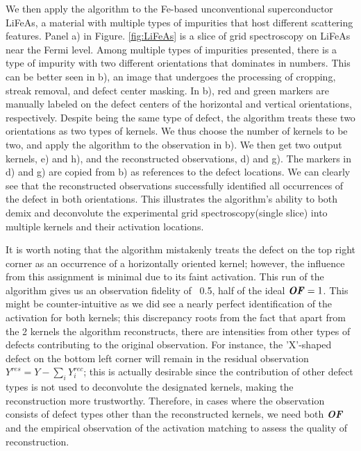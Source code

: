 We then apply the algorithm to the Fe-based unconventional superconductor LiFeAs, a material with multiple types of impurities that host different scattering features. Panel a) in Figure. \ref{fig:LiFeAs} is a slice of grid spectroscopy on LiFeAs near the Fermi level. Among multiple types of impurities presented, there is a type of impurity with two different orientations that dominates in numbers. This can be better seen in b), an image that undergoes the processing of cropping, streak removal, and defect center masking. In b), red and green markers are manually labeled on the defect centers of the horizontal and vertical orientations, respectively. Despite being the same type of defect, the algorithm treats these two orientations as two types of kernels. We thus choose the number of kernels to be two, and apply the algorithm to the observation in b). We then get two output kernels, e) and h), and the reconstructed observations, d) and g). The markers in d) and g) are copied from b) as references to the defect locations. We can clearly see that the reconstructed observations successfully identified all occurrences of the defect in both orientations. This illustrates the algorithm's ability to both demix and deconvolute the experimental grid spectroscopy(single slice) into multiple kernels and their activation locations. 

It is worth noting that the algorithm mistakenly treats the defect on the top right corner as an occurrence of a horizontally oriented kernel; however, the influence from this assignment is minimal due to its faint activation. This run of the algorithm gives us an observation fidelity of ~0.5, half of the ideal $\textbf{\textit{OF}} =1$. This might be counter-intuitive as we did see a nearly perfect identification of the activation for both kernels; this discrepancy roots from the fact that apart from the 2 kernels the algorithm reconstructs, there are intensities from other types of defects contributing to the original observation. For instance, the 'X'-shaped defect on the bottom left corner will remain in the residual observation $Y^{res} = Y - \sum_i Y_i^{rec}$; this is actually desirable since the contribution of other defect types is not used to deconvolute the designated kernels, making the reconstruction more trustworthy. Therefore, in cases where the observation consists of defect types other than the reconstructed kernels, we need both \textbf{\textit{OF}} and the empirical observation of the activation matching to assess the quality of reconstruction.  


